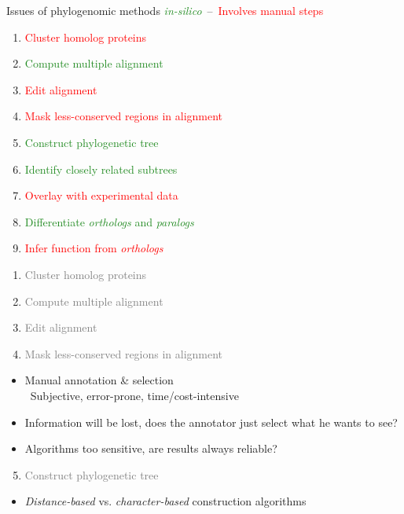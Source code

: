 \documentclass[14pt,xcolor=dvipsnames,pdftex]{beamer}
\begin{document}
\begin{frame}[allowframebreaks]{Issues of phylogenomic methods}
  \textcolor{ForestGreen}{\textit{in-silico}}\ --\ \textcolor{Red}{Involves manual steps}
 \begin{enumerate}
  \item \textcolor{Red}{Cluster homolog proteins}
  \item \textcolor{ForestGreen}{Compute multiple alignment}
  \item \textcolor{Red}{Edit alignment}
  \item \textcolor{Red}{Mask less-conserved regions in alignment}
  \item \textcolor{ForestGreen}{Construct phylogenetic tree}
  \item \textcolor{ForestGreen}{Identify closely related subtrees}
  \item \textcolor{Red}{Overlay with experimental data}
  \item \textcolor{ForestGreen}{Differentiate \textit{orthologs} and \textit{paralogs}}
  \item \textcolor{Red}{Infer function from \textit{orthologs}}
 \end{enumerate}
 \framebreak
 \begin{enumerate}
  \item \textcolor{gray}{Cluster homolog proteins}
  \item \textcolor{gray}{Compute multiple alignment}
  \item \textcolor{gray}{Edit alignment}
  \item \textcolor{gray}{Mask less-conserved regions in alignment}
  \end{enumerate}
  \begin{itemize}
   \item Manual annotation \& selection\\
   \textrightarrow\ Subjective, error-prone, time/cost-intensive
   \item Information will be lost, does the annotator just select what he wants to see?
   \item Algorithms too sensitive, are results always reliable?
  \end{itemize}
 \framebreak
 \begin{enumerate}
  \setcounter{enumi}{4}
  \item \textcolor{gray}{Construct phylogenetic tree}
 \end{enumerate}
 \begin{itemize}
  \item \textit{Distance-based} vs. \textit{character-based} construction algorithms

\end{itemize}
\end{frame}
\end{document}
